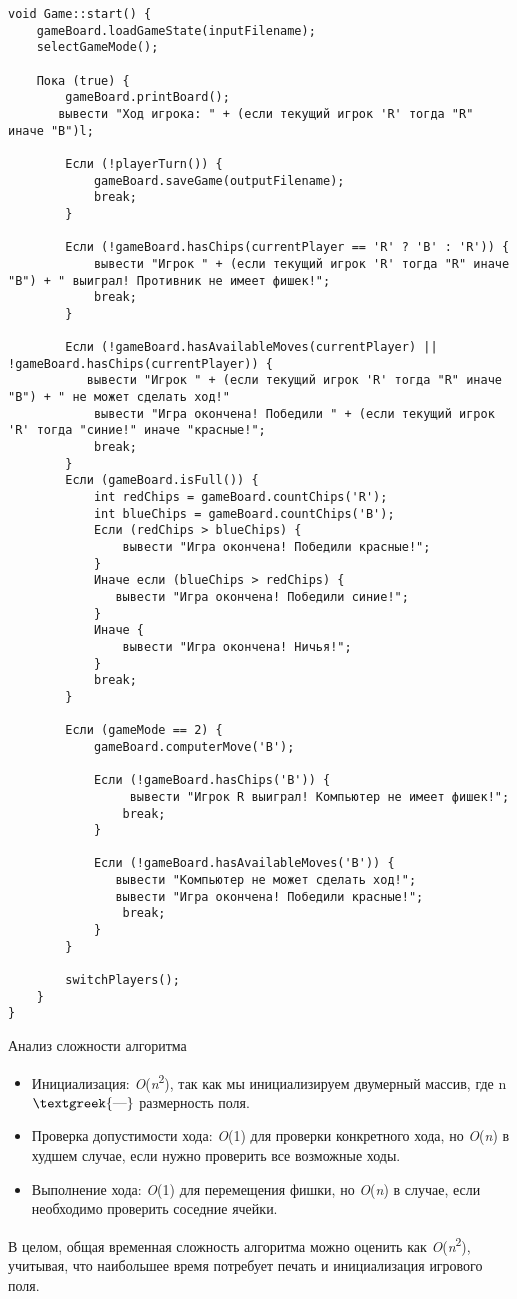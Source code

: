 \documentclass[a4paper]{article}
\begin{document}
\begin{verbatim}
void Game::start() {
    gameBoard.loadGameState(inputFilename);
    selectGameMode();

    Пока (true) {
        gameBoard.printBoard();
       вывести "Ход игрока: " + (если текущий игрок 'R' тогда "R" иначе "B")l;

        Если (!playerTurn()) {
            gameBoard.saveGame(outputFilename);
            break;
        }

        Если (!gameBoard.hasChips(currentPlayer == 'R' ? 'B' : 'R')) {
            вывести "Игрок " + (если текущий игрок 'R' тогда "R" иначе "B") + " выиграл! Противник не имеет фишек!";
            break;
        }

        Если (!gameBoard.hasAvailableMoves(currentPlayer) || !gameBoard.hasChips(currentPlayer)) {
           вывести "Игрок " + (если текущий игрок 'R' тогда "R" иначе "B") + " не может сделать ход!"
            вывести "Игра окончена! Победили " + (если текущий игрок 'R' тогда "синие!" иначе "красные!";
            break;
        }
        Если (gameBoard.isFull()) {
            int redChips = gameBoard.countChips('R');
            int blueChips = gameBoard.countChips('B');
            Если (redChips > blueChips) {
                вывести "Игра окончена! Победили красные!";
            }
            Иначе если (blueChips > redChips) {
               вывести "Игра окончена! Победили синие!";
            }
            Иначе {
                вывести "Игра окончена! Ничья!";
            }
            break;
        }

        Если (gameMode == 2) { 
            gameBoard.computerMove('B');

            Если (!gameBoard.hasChips('B')) {
                 вывести "Игрок R выиграл! Компьютер не имеет фишек!";
                break;
            }

            Если (!gameBoard.hasAvailableMoves('B')) {
               вывести "Компьютер не может сделать ход!";
               вывести "Игра окончена! Победили красные!";
                break;
            }
        }

        switchPlayers();
    }
}
\end{verbatim}


Анализ сложности алгоритма

\begin{itemize}[series=listWWNumxiii,label=$\cdot $]
\item Инициализация: \textit{O}(\textit{n}\textsuperscript{2}), так как мы инициализируем двумерный массив, где n
$\text{\textgreek{—}}$ размерность поля.
\item Проверка допустимости хода: \textit{O}(1) для проверки конкретного хода, но \textit{O}(\textit{n}) в худшем
случае, если нужно проверить все возможные ходы.
\item Выполнение хода: \textit{O}(1) для перемещения фишки, но\textit{ O}(\textit{n}) в случае, если необходимо
проверить соседние ячейки. 
\end{itemize}
В целом, общая временная сложность алгоритма можно оценить как \textit{O}(\textit{n}\textsuperscript{2}), учитывая, что
наибольшее время потребует печать и инициализация игрового поля.
\newpage 
\end{document}
